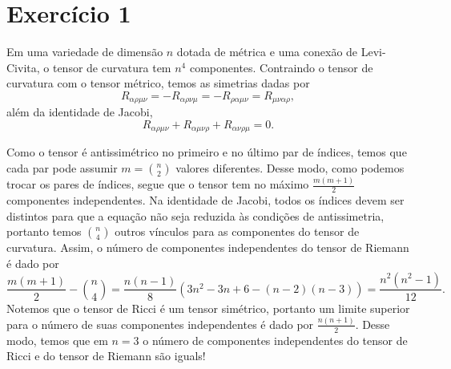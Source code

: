 \section*{Exercício 1}
Em uma variedade de dimensão \(n\) dotada de métrica e uma conexão de Levi-Civita, o tensor de curvatura tem \(n^4\) componentes. Contraindo o tensor de curvatura com o tensor métrico, temos as simetrias dadas por
\begin{equation*}
    R_{\alpha \rho \mu \nu} = - R_{\alpha \rho \nu \mu} = - R_{\rho \alpha \mu \nu} = R_{\mu\nu\alpha\rho},
\end{equation*}
além da identidade de Jacobi,
\begin{equation*}
    R_{\alpha \rho \mu \nu} + R_{\alpha \mu \nu \rho} + R_{\alpha \nu \rho \mu} = 0.
\end{equation*}

Como o tensor é antissimétrico no primeiro e no último par de índices, temos que cada par pode assumir \(m = \binom{n}{2}\) valores diferentes. Desse modo, como podemos trocar os pares de índices, segue que o tensor tem no máximo \(\frac{m(m+1)}{2}\) componentes independentes. Na identidade de Jacobi, todos os índices devem ser distintos para que a equação não seja reduzida às condições de antissimetria, portanto temos \(\binom{n}{4}\) outros vínculos para as componentes do tensor de curvatura. Assim, o número de componentes independentes do tensor de Riemann é dado por
\begin{equation*}
    \frac{m(m+1)}{2} - \binom{n}{4} = \frac{n(n-1)}{8}\left(3n^2 - 3n + 6 - (n-2)(n-3)\right) = \frac{n^2(n^2 - 1)}{12}.
\end{equation*}
Notemos que o tensor de Ricci é um tensor simétrico, portanto um limite superior para o número de suas componentes independentes é dado por \(\frac{n(n+1)}{2}\). Desse modo, temos que em \(n = 3\) o número de componentes independentes do tensor de Ricci e do tensor de Riemann são iguals!

